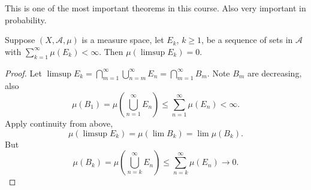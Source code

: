 
This is one of the most important theorems in this course. Also very important in probability.

\begin{theorem}
	\label{thm:BorelCantelliLem}
	
	Suppose $(X, \mathcal{A}, \mu)$ is a measure space, let $E_k$, $k \ge 1$, be a sequence of sets in $\mathcal{A}$ with $\sum_{k = 1}^\infty  \mu(E_k) < \infty $. Then $\mu(\limsup E_k) = 0$.
\end{theorem}
\begin{proof}
	Let $\limsup E_k = \bigcap_{m = 1} ^\infty  \bigcup_{n = m} ^\infty E_n = \bigcap_{m = 1}^\infty {B_m}  $.
	Note $B_m$ are decreasing, also
	\[
		\mu(B_1) = \mu\left( \bigcup_{n = 1} ^\infty  E_n \right) \le \sum_{n = 1}^\infty  \mu(E_n) < \infty 
	.\] 
	Apply continuity from above,
	\[
		\mu\left( \limsup E_k \right)  = \mu \left( \lim B_k \right) = \lim \mu\left( B_k \right) 
	.\] 
	But
	\[
		\mu(B_k) = \mu\left( \bigcup_{n = k} ^\infty  E_n \right) \le \sum_{n = k}^\infty  \mu(E_n) \to 0
	.\] 
\end{proof}

